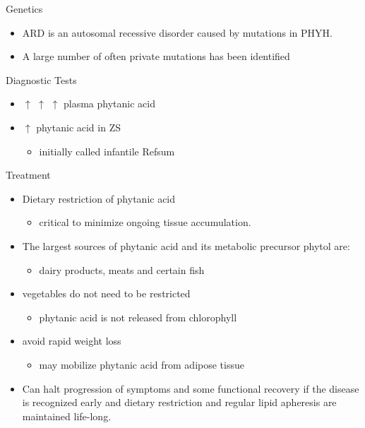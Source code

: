\documentclass[presentation, smaller]{beamer}
\begin{document}
\begin{frame}[label={sec:orge4268e0}]{Genetics}
\begin{itemize}
\item ARD is an autosomal recessive disorder caused by mutations in PHYH.
\item A large number of often private mutations has been identified
\end{itemize}
\end{frame}

\begin{frame}[label={sec:org676d4fa}]{Diagnostic Tests}
\begin{itemize}
\item \(\uparrow\) \(\uparrow\) \(\uparrow\) plasma phytanic acid
\item \(\uparrow\) phytanic acid in ZS
\begin{itemize}
\item initially called infantile Refsum
\end{itemize}
\end{itemize}
\end{frame}

\begin{frame}[label={sec:orgaab0fe6}]{Treatment}
\begin{itemize}
\item Dietary restriction of phytanic acid 
\begin{itemize}
\item critical to minimize ongoing tissue accumulation.
\end{itemize}
\item The largest sources of phytanic acid and its metabolic precursor phytol are:
\begin{itemize}
\item dairy products, meats and certain fish
\end{itemize}
\item vegetables do not need to be restricted
\begin{itemize}
\item phytanic acid is not released from chlorophyll
\end{itemize}
\item avoid rapid weight loss
\begin{itemize}
\item may mobilize phytanic acid from adipose tissue
\end{itemize}
\item Can halt progression of symptoms and some functional recovery if the
disease is recognized early and dietary restriction and regular
lipid apheresis are maintained life-long.
\end{itemize}
\end{frame}
\end{document}
